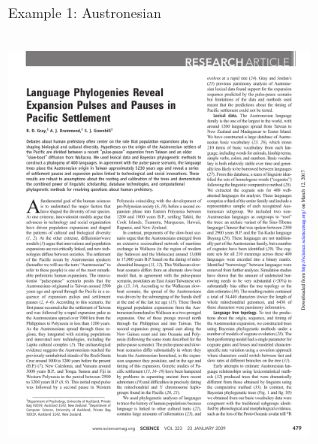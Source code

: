 \documentclass[9pt]{beamer}
\begin{document}
\begin{frame}{Example 1: Austronesian}
\begin{columns}
\begin{column}{0.5\textwidth}
      \includegraphics[width=0.6\textwidth,page=3,trim={1cm 1cm 7.5cm 16cm},clip]{austronesian.pdf}
    \end{column}
  \end{columns}
\end{frame}
\end{document}
